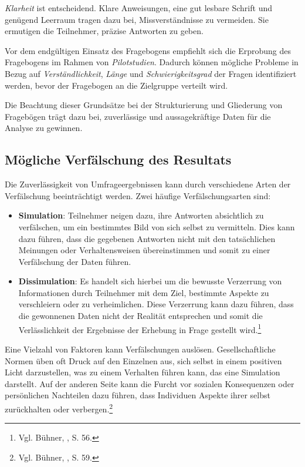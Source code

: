\textit{Klarheit} ist entscheidend. Klare Anweisungen, eine gut lesbare Schrift und genügend Leerraum tragen dazu bei,
Missverständnisse zu vermeiden. Sie ermutigen die Teilnehmer, präzise Antworten zu geben.

Vor dem endgültigen Einsatz des Fragebogens empfiehlt sich die Erprobung des Fragebogens im Rahmen von \textit{Pilotstudien}.
Dadurch können mögliche Probleme in Bezug auf \textit{Verständlichkeit}, \textit{Länge} und \textit{Schwierigkeitsgrad}
der Fragen identifiziert werden, bevor der Fragebogen an die Zielgruppe verteilt wird.

Die Beachtung dieser Grundsätze bei der Strukturierung und Gliederung von Fragebögen trägt dazu bei, zuverlässige und
aussagekräftige Daten für die Analyse zu gewinnen.

\subsection{Mögliche Verfälschung des Resultats}
Die Zuverlässigkeit von Umfrageergebnissen kann durch verschiedene Arten der Verfälschung beeinträchtigt werden. Zwei
häufige Verfälschungsarten sind:
\begin{itemize}
    \item \textbf{Simulation}: Teilnehmer neigen dazu, ihre Antworten absichtlich zu verfälschen, um ein bestimmtes Bild
    von sich selbst zu vermitteln. Dies kann dazu führen, dass die gegebenen Antworten nicht mit den tatsächlichen
    Meinungen oder Verhaltensweisen übereinstimmen und somit zu einer Verfälschung der Daten führen.

    \item \textbf{Dissimulation}: Es handelt sich hierbei um die bewusste Verzerrung von Informationen durch Teilnehmer
    mit dem Ziel, bestimmte Aspekte zu verschleiern oder zu verheimlichen. Diese Verzerrung kann dazu führen, dass die
    gewonnenen Daten nicht der Realität entsprechen und somit die Verlässlichkeit der Ergebnisse der Erhebung in Frage
    gestellt wird.\footnote{Vgl. Bühner, \cite{Einfuehrung in die TEst und Fragebogenkonstruktion}, S. 56.}\\
\end{itemize}

Eine Vielzahl von Faktoren kann Verfälschungen auslösen. Gesellschaftliche Normen üben oft Druck auf den Einzelnen aus,
sich selbst in einem positiven Licht darzustellen, was zu einem Verhalten führen kann, das eine Simulation darstellt. Auf
der anderen Seite kann die Furcht vor sozialen Konsequenzen oder persönlichen Nachteilen dazu führen, dass Individuen
Aspekte ihrer selbst zurückhalten oder verbergen.\footnote{Vgl. Bühner, \cite{Einfuehrung in die TEst und Fragebogenkonstruktion}, S. 59.}

